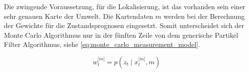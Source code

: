 Die zwingende Voraussetzung, für die Lokalisierung, ist das vorhanden sein einer sehr genauen Karte der Umwelt. Die Kartendaten $m$ werden bei der Berechnung der Gewichte für die Zustandsprognosen eingesetzt. Somit unterscheidet sich der Monte Carlo Algorithmus nur in der fünften Zeile von dem generische Partikel Filter Algorithmus, siehe \autoref{eq:monte_carlo_measurement_model}. 

\begin{equation}
w^{\lbrack m \rbrack}_t = p(z_t \mid x^{\lbrack m \rbrack}_t, m) \label{eq:monte_carlo_measurement_model}
\end{equation}

%

